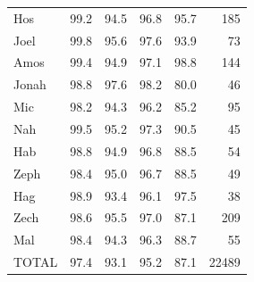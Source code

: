 \begin{table}[ht]
\begin{tabular}{lrrrrr}
Hos & 99.2 & 94.5 & 96.8 & 95.7 & 185 \\
Joel & 99.8 & 95.6 & 97.6 & 93.9 & 73 \\
Amos & 99.4 & 94.9 & 97.1 & 98.8 & 144 \\
Jonah & 98.8 & 97.6 & 98.2 & 80.0 & 46 \\
Mic & 98.2 & 94.3 & 96.2 & 85.2 & 95 \\
Nah & 99.5 & 95.2 & 97.3 & 90.5 & 45 \\
Hab & 98.8 & 94.9 & 96.8 & 88.5 & 54 \\
Zeph & 98.4 & 95.0 & 96.7 & 88.5 & 49 \\
Hag & 98.9 & 93.4 & 96.1 & 97.5 & 38 \\
Zech & 98.6 & 95.5 & 97.0 & 87.1 & 209 \\
Mal & 98.4 & 94.3 & 96.3 & 88.7 & 55 \\
\midrule
TOTAL & 97.4 & 93.1 & 95.2 & 87.1 & 22489 \\
\bottomrule
\end{tabular}
\end{table}
